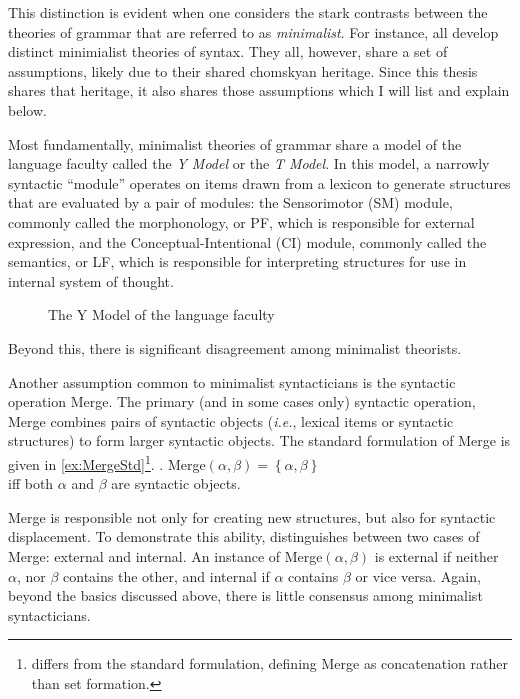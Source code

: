 \documentclass[MilwayThesis]{subfiles}
\begin{document}
This distinction is evident when one considers the stark contrasts between the theories of grammar that are referred to as \textit{minimalist}.
For instance, \textcite{chomsky2000minimalist,hornstein2009theory,frampton2008crash,epstein2006derivations,borer2005name,borer2005normal,borer2013taking} all develop distinct minimialist theories of syntax.
They all, however, share a set of assumptions, likely due to their shared chomskyan heritage.
Since this thesis shares that heritage, it also shares those assumptions which I will list and explain below.

Most fundamentally, minimalist theories of grammar share a model of the language faculty called the \textit{Y Model} or the \textit{T Model}.
In this model, a narrowly syntactic ``module'' operates on items drawn from a lexicon to generate structures that are evaluated by a pair of modules:
the Sensorimotor (SM) module, commonly called the morphonology, or PF, which is responsible for external expression, and the Conceptual-Intentional (CI) module, commonly called the semantics, or LF, which is responsible for interpreting structures for use in internal system of thought.
\begin{figure}[h]
	\centering
	\caption{The Y Model of the language faculty}
	\label{fig:YModel}
\end{figure}
Beyond this, there is significant disagreement among minimalist theorists.

Another assumption common to minimalist syntacticians is the syntactic operation Merge.
The primary (and in some cases only) syntactic operation, Merge combines pairs of syntactic objects (\textit{i.e.}, lexical items or syntactic structures) to form larger syntactic objects.
The standard formulation of Merge is given in \cref{ex:MergeStd}\footnote{
	\textcite{hornstein2009theory} differs from the standard formulation, defining Merge as concatenation rather than set formation.
}.
\ex.\label{ex:MergeStd} Merge$(\alpha, \beta) = \left\{ \alpha, \beta \right\}$\\
iff both $\alpha$ and $\beta$ are syntactic objects.

Merge is responsible not only for creating new structures, but also for syntactic displacement.
To demonstrate this ability, \textcite{chomsky2004beyond} distinguishes between two cases of Merge: external and internal.
An instance of Merge$(\alpha, \beta)$ is external if neither $\alpha$, nor $\beta$ contains the other, and internal if $\alpha$ contains $\beta$ or vice versa.
Again, beyond the basics discussed above, there is little consensus among minimalist syntacticians.
\end{document}
